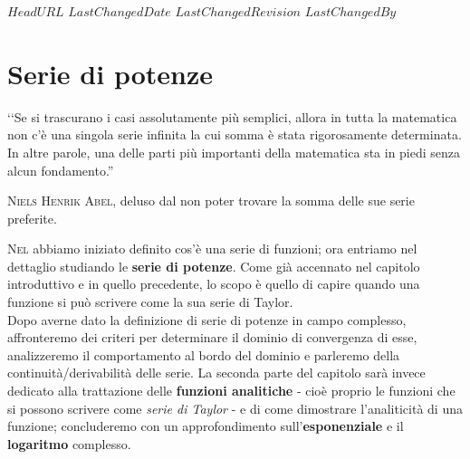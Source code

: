 \svnidlong
{$HeadURL$}
{$LastChangedDate$}
{$LastChangedRevision$}
{$LastChangedBy$}

\chapter{Serie di potenze}

\begin{introduction}
	‘‘Se si trascurano i casi assolutamente più semplici, allora in tutta la matematica non c'è una singola serie infinita la cui somma è stata rigorosamente determinata. In altre parole, una delle parti più importanti della matematica sta in piedi senza alcun fondamento.''
	\begin{flushright}
		\textsc{Niels Henrik Abel,} deluso dal non poter trovare la somma delle sue serie preferite.
	\end{flushright}
\end{introduction}
\lettrine[findent=1pt, nindent=0pt]{N}{el}  abbiamo iniziato definito cos'è una serie di funzioni; ora entriamo nel dettaglio studiando le \textbf{serie di potenze}. Come già accennato nel capitolo introduttivo e in quello precedente, lo scopo è quello di capire quando una funzione si può scrivere come la sua serie di Taylor.\\
Dopo averne dato la definizione di serie di potenze in campo complesso, affronteremo dei criteri per determinare il dominio di convergenza di esse, analizzeremo il comportamento al bordo del dominio e parleremo della continuità/derivabilità delle serie. La seconda parte del capitolo sarà invece dedicato alla trattazione delle \textbf{funzioni analitiche} - cioè proprio le funzioni che si possono scrivere come \textit{serie di Taylor} - e di come dimostrare l'analiticità di una funzione; concluderemo con un approfondimento sull'\textbf{esponenziale} e il \textbf{logaritmo} complesso.
